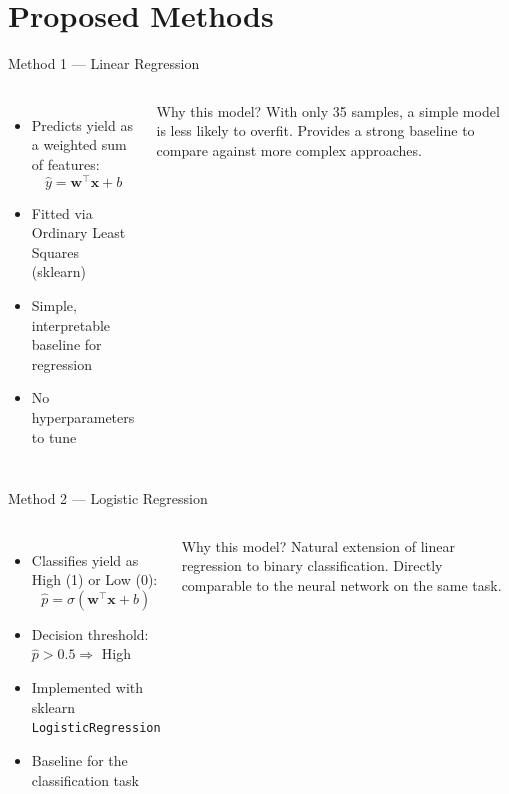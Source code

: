\documentclass[aspectratio=169]{beamer}
\begin{document}
\section{Proposed Methods}

\begin{frame}{Method 1 --- Linear Regression}
  \begin{columns}
      \begin{itemize}
        \item Predicts yield as a weighted sum of features:
          \[ \hat{y} = \mathbf{w}^\top \mathbf{x} + b \]
        \item Fitted via Ordinary Least Squares (sklearn)
        \item Simple, interpretable baseline for regression
        \item No hyperparameters to tune
      \end{itemize}
      \begin{block}{Why this model?}
        With only 35 samples, a simple model is less likely to overfit.
        Provides a strong baseline to compare against more complex approaches.
      \end{block}
  \end{columns}
\end{frame}

\begin{frame}{Method 2 --- Logistic Regression}
  \begin{columns}
      \begin{itemize}
        \item Classifies yield as High (1) or Low (0):
          \[ \hat{p} = \sigma(\mathbf{w}^\top \mathbf{x} + b) \]
        \item Decision threshold: $\hat{p} > 0.5 \Rightarrow$ High
        \item Implemented with sklearn \texttt{LogisticRegression}
        \item Baseline for the classification task
      \end{itemize}
      \begin{block}{Why this model?}
        Natural extension of linear regression to binary classification.
        Directly comparable to the neural network on the same task.
      \end{block}
  \end{columns}
\end{frame}
\end{document}
